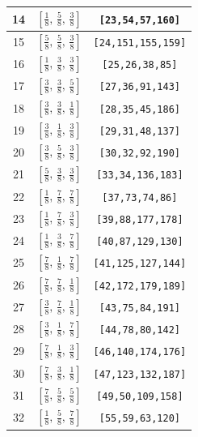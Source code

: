 \documentclass[fleqn,8pt]{jsarticle}
\begin{document}
\begin{longtable}{ccc}
14 & $\left[ \frac{1}{8},\, \frac{5}{8},\, \frac{3}{8} \right]$ & {\tt [23,54,57,160]} \\ \hline
15 & $\left[ \frac{5}{8},\, \frac{5}{8},\, \frac{3}{8} \right]$ & {\tt [24,151,155,159]} \\ \hline
16 & $\left[ \frac{1}{8},\, \frac{3}{8},\, \frac{3}{8} \right]$ & {\tt [25,26,38,85]} \\ \hline
17 & $\left[ \frac{3}{8},\, \frac{3}{8},\, \frac{5}{8} \right]$ & {\tt [27,36,91,143]} \\ \hline
18 & $\left[ \frac{3}{8},\, \frac{3}{8},\, \frac{1}{8} \right]$ & {\tt [28,35,45,186]} \\ \hline
19 & $\left[ \frac{3}{8},\, \frac{1}{8},\, \frac{3}{8} \right]$ & {\tt [29,31,48,137]} \\ \hline
20 & $\left[ \frac{3}{8},\, \frac{5}{8},\, \frac{3}{8} \right]$ & {\tt [30,32,92,190]} \\ \hline
21 & $\left[ \frac{5}{8},\, \frac{3}{8},\, \frac{3}{8} \right]$ & {\tt [33,34,136,183]} \\ \hline
22 & $\left[ \frac{1}{8},\, \frac{7}{8},\, \frac{7}{8} \right]$ & {\tt [37,73,74,86]} \\ \hline
23 & $\left[ \frac{1}{8},\, \frac{7}{8},\, \frac{3}{8} \right]$ & {\tt [39,88,177,178]} \\ \hline
24 & $\left[ \frac{1}{8},\, \frac{3}{8},\, \frac{7}{8} \right]$ & {\tt [40,87,129,130]} \\ \hline
25 & $\left[ \frac{7}{8},\, \frac{1}{8},\, \frac{7}{8} \right]$ & {\tt [41,125,127,144]} \\ \hline
26 & $\left[ \frac{7}{8},\, \frac{7}{8},\, \frac{1}{8} \right]$ & {\tt [42,172,179,189]} \\ \hline
27 & $\left[ \frac{3}{8},\, \frac{7}{8},\, \frac{1}{8} \right]$ & {\tt [43,75,84,191]} \\ \hline
28 & $\left[ \frac{3}{8},\, \frac{1}{8},\, \frac{7}{8} \right]$ & {\tt [44,78,80,142]} \\ \hline
29 & $\left[ \frac{7}{8},\, \frac{1}{8},\, \frac{3}{8} \right]$ & {\tt [46,140,174,176]} \\ \hline
30 & $\left[ \frac{7}{8},\, \frac{3}{8},\, \frac{1}{8} \right]$ & {\tt [47,123,132,187]} \\ \hline
31 & $\left[ \frac{7}{8},\, \frac{5}{8},\, \frac{5}{8} \right]$ & {\tt [49,50,109,158]} \\ \hline
32 & $\left[ \frac{1}{8},\, \frac{5}{8},\, \frac{7}{8} \right]$ & {\tt [55,59,63,120]} \\ \hline

\end{longtable}
\end{document}
